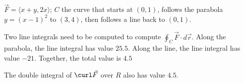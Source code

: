 {$\vec F = \langle x+y,2x\rangle$; $C$ the curve that starts at $(0,1)$, follows the parabola $y=(x-1)^2$ to $(3,4)$, then follows a line back to $(0,1)$.
}
{Two line integrals need to be computed to compute $\oint_C \vec F\cdot d\vec r$. 
Along the parabola, the line integral has value $25.5$. Along the line, the line integral has value $-21$. Together, the total value is $4.5$

The double integral of $\curl\vec F$ over $R$ also has value $4.5$.
}
